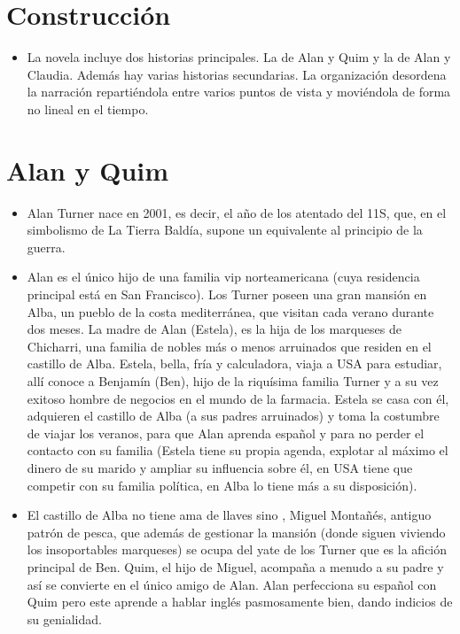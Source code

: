 \section*{Construcción}
\begin{itemize}
\item La novela incluye dos historias principales. La de Alan y Quim y la de Alan y Claudia. Además hay varias historias secundarias. La organización desordena la narración repartiéndola entre varios puntos de vista y moviéndola de forma no lineal en el tiempo. 
\end{itemize}


\section*{Alan y Quim}

\begin{itemize}
\item Alan Turner nace en 2001, es decir, el año de los atentado del 11S, que, en el simbolismo de La Tierra Baldía, supone un equivalente al principio de la guerra. 
\item   Alan es el único hijo de una familia vip norteamericana (cuya residencia principal está en San Francisco).  Los Turner poseen una gran mansión en Alba, un pueblo de la costa mediterránea, que visitan cada verano durante dos meses. La madre de Alan (Estela), es la hija de los marqueses de Chicharri, una familia de nobles más o menos arruinados que residen en el castillo de Alba. Estela, bella, fría y calculadora, viaja a USA para estudiar, allí conoce a Benjamín (Ben), hijo de la riquísima familia Turner y a su vez exitoso hombre de negocios en el mundo de la farmacia.  Estela se casa con él, adquieren el castillo de Alba (a sus padres arruinados) y toma la costumbre de viajar los veranos, para que Alan aprenda español y para no perder el contacto con su familia (Estela tiene su propia agenda, explotar al máximo el dinero de su marido y ampliar su influencia sobre él, en USA tiene que competir con su familia política, en Alba lo tiene más a su disposición).  
\item El castillo de Alba no tiene ama de llaves sino , Miguel Montañés, antiguo patrón de pesca, que además de gestionar la mansión (donde siguen viviendo los insoportables marqueses) se ocupa del yate de los Turner que es la afición principal de Ben. Quim, el hijo de Miguel, acompaña a menudo a su padre y así se convierte en el único amigo de Alan. Alan perfecciona su español con Quim pero este aprende a hablar inglés pasmosamente bien, dando indicios de su genialidad. 

\end{itemize}
